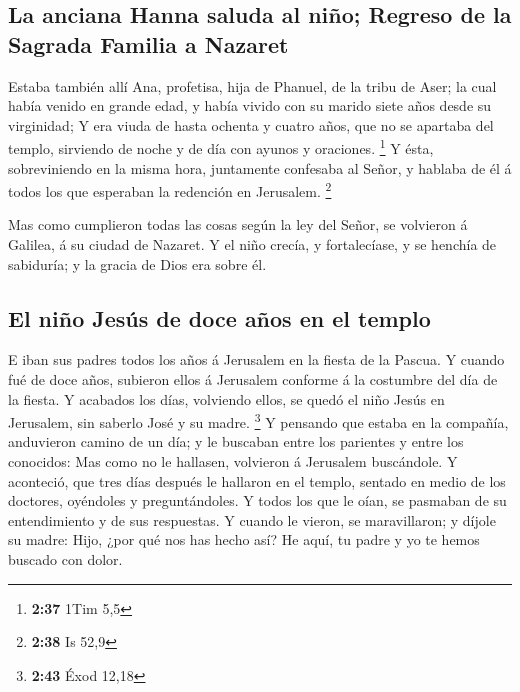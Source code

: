 \hypertarget{la-anciana-hanna-saluda-al-niuxf1o-regreso-de-la-sagrada-familia-a-nazaret}{%
\subsection{La anciana Hanna saluda al niño; Regreso de la Sagrada
Familia a
Nazaret}\label{la-anciana-hanna-saluda-al-niuxf1o-regreso-de-la-sagrada-familia-a-nazaret}}

 Estaba también allí Ana, profetisa, hija de Phanuel, de
la tribu de Aser; la cual había venido en grande edad, y había vivido
con su marido siete años desde su virginidad;  Y era
viuda de hasta ochenta y cuatro años, que no se apartaba del templo,
sirviendo de noche y de día con ayunos y oraciones. \footnote{\textbf{2:37}
  1Tim 5,5}  Y ésta, sobreviniendo en la misma hora,
juntamente confesaba al Señor, y hablaba de él á todos los que esperaban
la redención en Jerusalem. \footnote{\textbf{2:38} Is 52,9}

 Mas como cumplieron todas las cosas según la ley del
Señor, se volvieron á Galilea, á su ciudad de Nazaret.  Y
el niño crecía, y fortalecíase, y se henchía de sabiduría; y la gracia
de Dios era sobre él.

\hypertarget{el-niuxf1o-jesuxfas-de-doce-auxf1os-en-el-templo}{%
\subsection{El niño Jesús de doce años en el
templo}\label{el-niuxf1o-jesuxfas-de-doce-auxf1os-en-el-templo}}

 E iban sus padres todos los años á Jerusalem en la
fiesta de la Pascua.  Y cuando fué de doce años, subieron
ellos á Jerusalem conforme á la costumbre del día de la fiesta.
 Y acabados los días, volviendo ellos, se quedó el niño
Jesús en Jerusalem, sin saberlo José y su madre. \footnote{\textbf{2:43}
  Éxod 12,18}  Y pensando que estaba en la compañía,
anduvieron camino de un día; y le buscaban entre los parientes y entre
los conocidos:  Mas como no le hallasen, volvieron á
Jerusalem buscándole.  Y aconteció, que tres días después
le hallaron en el templo, sentado en medio de los doctores, oyéndoles y
preguntándoles.  Y todos los que le oían, se pasmaban de
su entendimiento y de sus respuestas.  Y cuando le
vieron, se maravillaron; y díjole su madre: Hijo, ¿por qué nos has hecho
así? He aquí, tu padre y yo te hemos buscado con dolor.

